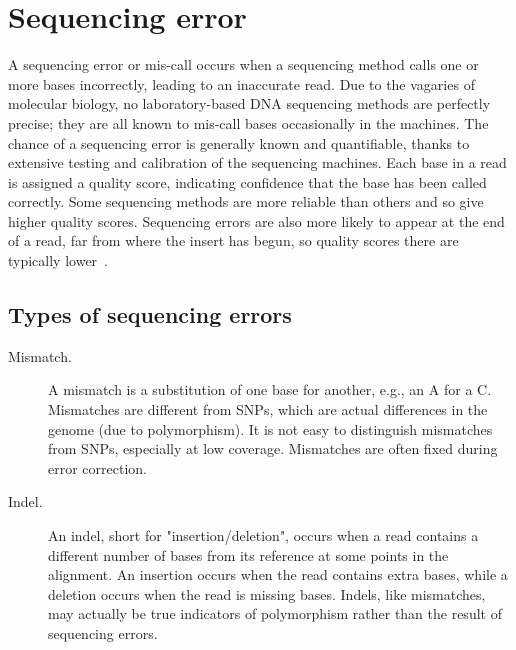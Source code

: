 \section{Sequencing error}
A sequencing error or mis-call occurs when a sequencing method calls one or more bases incorrectly, leading to an inaccurate read. Due to the vagaries of molecular biology, no laboratory-based DNA sequencing methods are perfectly precise; they are all known to mis-call bases occasionally in the machines. The chance of a sequencing error is generally known and quantifiable, thanks to extensive testing and calibration of the sequencing machines. Each base in a read is assigned a quality score, indicating confidence that the base has been called correctly. Some sequencing methods are more reliable than others and so give higher quality scores. Sequencing errors are also more likely to appear at the end of a read, far from where the insert has begun, so quality scores there are typically lower~\cite{sequencing_error}.

\subsection{Types of sequencing errors}
\begin{description}

\item [Mismatch.]
A mismatch is a substitution of one base for another, e.g., an A for a C. Mismatches are different from SNPs, which are actual differences in the genome (due to polymorphism). It is not easy to distinguish mismatches from SNPs, especially at low coverage. Mismatches are often fixed during error correction.

\item [Indel.]
An indel, short for "insertion/deletion", occurs when a read contains a different number of bases from its reference at some points in the alignment. An insertion occurs when the read contains extra bases, while a deletion occurs when the read is missing bases. Indels, like mismatches, may actually be true indicators of polymorphism rather than the result of sequencing errors.
\end{description}

